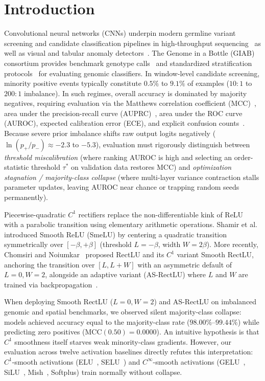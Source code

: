 \documentclass[10pt,a4paper]{article}
\begin{document}
\section{Introduction}
Convolutional neural networks (CNNs) underpin modern germline variant screening and candidate classification pipelines in high-throughput sequencing~\cite{poplin2018,luo2019,eraslan2019} as well as visual and tabular anomaly detectors~\cite{johnson2019,buda2018}. The Genome in a Bottle (GIAB) consortium provides benchmark genotype calls~\cite{zook2014,zook2019} and standardized stratification protocols~\cite{krusche2019,olson2022} for evaluating genomic classifiers. In window-level candidate screening, minority positive events typically constitute $0.5\%$ to $9.1\%$ of examples ($10:1$ to $200:1$ imbalance). In such regimes, overall accuracy is dominated by majority negatives, requiring evaluation via the Matthews correlation coefficient (MCC)~\cite{chicco2020,boughorbel2017}, area under the precision-recall curve (AUPRC)~\cite{saito2015,davis2006}, area under the ROC curve (AUROC), expected calibration error (ECE), and explicit confusion counts~\cite{branco2016}. Because severe prior imbalance shifts raw output logits negatively ($\ln(p_+/p_-) \approx -2.3$ to $-5.3$), evaluation must rigorously distinguish between \textit{threshold miscalibration} (where ranking AUROC is high and selecting an order-statistic threshold $\tau^*$ on validation data restores MCC) and \textit{optimization stagnation / majority-class collapse} (where multi-layer variance contraction stalls parameter updates, leaving AUROC near chance or trapping random seeds permanently).

Piecewise-quadratic $C^1$ rectifiers replace the non-differentiable kink of ReLU~\cite{nair2010,glorot2011} with a parabolic transition using elementary arithmetic operations. Shamir et al.~\cite{shamir2020} introduced Smooth ReLU (SmeLU) by centering a quadratic transition symmetrically over $[-\beta, +\beta]$ (threshold $L = -\beta$, width $W = 2\beta$). More recently, Chomsiri and Noiumkar~\cite{chomsiri2026} proposed RectLU and its $C^1$ variant Smooth RectLU, anchoring the transition over $[L, L+W]$ with an asymmetric default of $L=0, W=2$, alongside an adaptive variant (AS-RectLU) where $L$ and $W$ are trained via backpropagation~\cite{he2015,apicella2019,dubey2022}.

When deploying Smooth RectLU ($L=0, W=2$) and AS-RectLU on imbalanced genomic and spatial benchmarks, we observed silent majority-class collapse: models achieved accuracy equal to the majority-class rate ($98.00\%$--$99.44\%$) while predicting zero positives ($\text{MCC}(0.50) = 0.0000$). An intuitive hypothesis is that $C^1$ smoothness itself starves weak minority-class gradients. However, our evaluation across twelve activation baselines directly refutes this interpretation: $C^1$-smooth activations (ELU~\cite{clevert2016}, SELU~\cite{klambauer2017}) and $C^\infty$-smooth activations (GELU~\cite{hendrycks2016}, SiLU~\cite{ramachandran2017}, Mish~\cite{misra2020}, Softplus) train normally without collapse.
\end{document}
